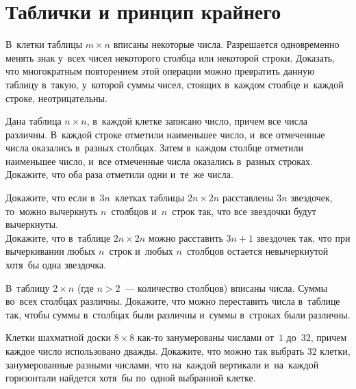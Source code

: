 
\section*{Таблички и принцип крайнего}


\begin{problems}

\item
В~клетки таблицы $m \times n$ вписаны некоторые числа.
Разрешается одновременно менять знак у~всех чисел некоторого столбца или
некоторой строки.
Доказать, что многократным повторением этой операции можно превратить данную
таблицу в~такую, у~которой суммы чисел, стоящих в~каждом столбце и~каждой
строке, неотрицательны.

\item
Дана таблица $n \times n$, в~каждой клетке записано число, причем все числа
различны.
В~каждой строке отметили наименьшее число, и~все отмеченные числа оказались
в~разных столбцах.
Затем в~каждом столбце отметили наименьшее число, и~все отмеченные числа
оказались в~разных строках.
Докажите, что оба раза отметили одни и~те~же числа.

\item
\subproblem
Докажите, что если в~$3n$~клетках таблицы $2n \times 2n$ расставлены $3n$
звездочек, то~можно вычеркнуть $n$~столбцов и~$n$~строк так, что все звездочки
будут вычеркнуты.
\\
\subproblem
Докажите, что в~таблице $2n \times 2n$ можно расставить $3 n + 1$ звездочек
так, что при вычеркивании любых $n$~строк и~любых $n$~столбцов остается
невычеркнутой хотя~бы одна звездочка.

\item
В~таблицу $2 \times n$ (где $n > 2$~--- количество столбцов) вписаны числа.
Суммы во~всех столбцах различны.
Докажите, что можно переставить числа в~таблице так, чтобы суммы в~столбцах
были различны и~суммы в~строках были различны.

\item
Клетки шахматной доски $8 \times 8$ как-то занумерованы числами от~$1$ до~$32$,
причем каждое число использовано дважды.
Докажите, что можно так выбрать $32$ клетки, занумерованные разными числами,
что на~каждой вертикали и~на~каждой горизонтали найдется хотя~бы по~одной
выбранной клетке.



\end{problems}
